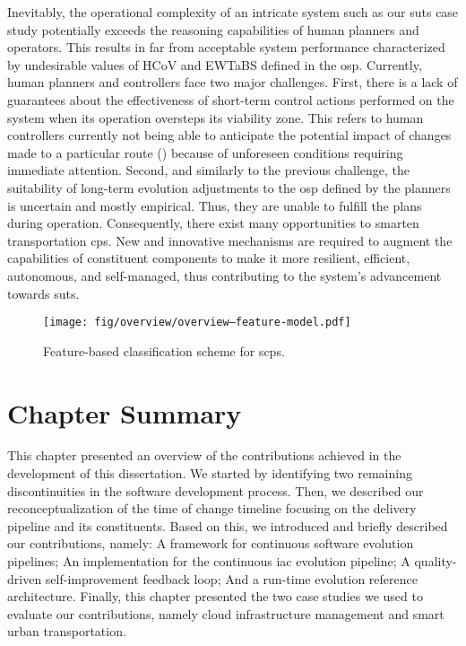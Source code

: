 Inevitably, the operational complexity of an intricate system such as our \gls{suts} case study potentially exceeds the reasoning capabilities of human planners and operators. This results in far from acceptable system performance characterized by undesirable values of \gls{HCoV} and \gls{EWTaBS} defined in the \gls{osp}. Currently, human planners and controllers face two major challenges. First, there is a lack of guarantees about the effectiveness of short-term control actions performed on the system when its operation oversteps its viability zone. This refers to human controllers currently not being able to anticipate the potential impact of changes made to a particular route () because of unforeseen conditions requiring immediate attention. Second, and similarly to the previous challenge, the suitability of long-term evolution adjustments to the \gls{osp} defined by the planners is uncertain and mostly empirical. Thus, they are unable to fulfill the plans during operation. Consequently, there exist many opportunities to smarten transportation \gls{cps}. New and innovative mechanisms are required to augment the capabilities of constituent components to make it more resilient, efficient, autonomous, and self-managed, thus contributing to the system's advancement towards \gls{suts}.

\begin{landscape}
	\begin{figure}[p]
		\centering
		\texttt{[image: fig/overview/overview--feature-model.pdf]}
		\caption{Feature-based classification scheme for \gls{scps}.}
		\label{fig:overview--suts-feature-model}
	\end{figure}
\end{landscape}

\section{Chapter Summary}

This chapter presented an overview of the contributions achieved in the development of this dissertation. We started by identifying two remaining discontinuities in the software development process. Then, we described our reconceptualization of the time of change timeline focusing on the delivery pipeline and its constituents. Based on this, we introduced and briefly described our contributions, namely: A framework for continuous software evolution pipelines; An implementation for the continuous \acrshort{iac} evolution pipeline; A quality-driven self-improvement feedback loop; And a run-time evolution reference architecture. Finally, this chapter presented the two case studies we used to evaluate our contributions, namely cloud infrastructure management and smart urban transportation.
